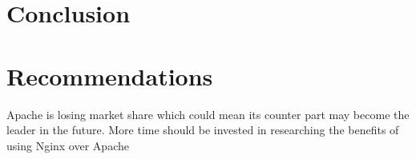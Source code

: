 \documentclass[a4paper,11pt]{article}
\numberwithin{figure}{subsection}
\begin{document}
\section{Conclusion}
\newpage

\section{Recommendations}
Apache is losing market share which could mean its counter part may become the leader in the future. More time should be invested in researching the benefits of using Nginx over Apache
\newpage




\newpage
\end{document}
